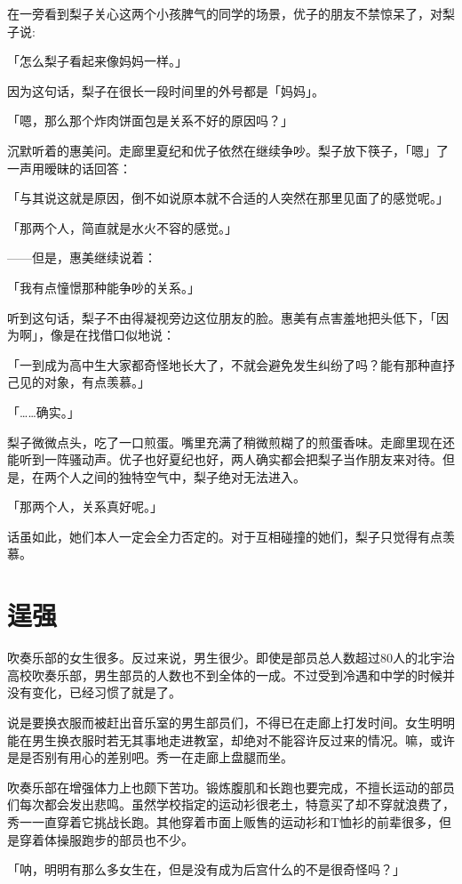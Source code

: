 \documentclass[UTF8]{ctexart}
\begin{document}
    在一旁看到梨子关心这两个小孩脾气的同学的场景，优子的朋友不禁惊呆了，对梨子说:

    「怎么梨子看起来像妈妈一样。」

    因为这句话，梨子在很长一段时间里的外号都是「妈妈」。

    「嗯，那么那个炸肉饼面包是关系不好的原因吗？」

    沉默听着的惠美问。走廊里夏纪和优子依然在继续争吵。梨子放下筷子，「嗯」了一声用暧昧的话回答：

    「与其说这就是原因，倒不如说原本就不合适的人突然在那里见面了的感觉呢。」

    「那两个人，简直就是水火不容的感觉。」

    ——但是，惠美继续说着：

    「我有点憧憬那种能争吵的关系。」

    听到这句话，梨子不由得凝视旁边这位朋友的脸。惠美有点害羞地把头低下，「因为啊」，像是在找借口似地说：

    「一到成为高中生大家都奇怪地长大了，不就会避免发生纠纷了吗？能有那种直抒己见的对象，有点羡慕。」

    「……确实。」

    梨子微微点头，吃了一口煎蛋。嘴里充满了稍微煎糊了的煎蛋香味。走廊里现在还能听到一阵骚动声。优子也好夏纪也好，两人确实都会把梨子当作朋友来对待。但是，在两个人之间的独特空气中，梨子绝对无法进入。

    「那两个人，关系真好呢。」

    话虽如此，她们本人一定会全力否定的。对于互相碰撞的她们，梨子只觉得有点羡慕。
    \section{逞强}
    吹奏乐部的女生很多。反过来说，男生很少。即使是部员总人数超过80人的北宇治高校吹奏乐部，男生部员的人数也不到全体的一成。不过受到冷遇和中学的时候并没有变化，已经习惯了就是了。

    说是要换衣服而被赶出音乐室的男生部员们，不得已在走廊上打发时间。女生明明能在男生换衣服时若无其事地走进教室，却绝对不能容许反过来的情况。嘛，或许是是否别有用心的差别吧。秀一在走廊上盘腿而坐。

    吹奏乐部在增强体力上也颇下苦功。锻炼腹肌和长跑也要完成，不擅长运动的部员们每次都会发出悲鸣。虽然学校指定的运动衫很老土，特意买了却不穿就浪费了，秀一一直穿着它挑战长跑。其他穿着市面上贩售的运动衫和T恤衫的前辈很多，但是穿着体操服跑步的部员也不少。

    「呐，明明有那么多女生在，但是没有成为后宫什么的不是很奇怪吗？」
\end{document}
